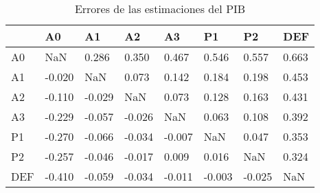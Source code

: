 \begin{table}[htbp]
\centering
\caption{Errores de las estimaciones del PIB}
\label{tab:errores_pib}
\begin{tabular}{llllllll}
\toprule
{} &      A0 &      A1 &      A2 &      A3 &      P1 &      P2 &    DEF \\
\midrule
A0  &     NaN &   0.286 &   0.350 &   0.467 &   0.546 &   0.557 &  0.663 \\
A1  &  -0.020 &     NaN &   0.073 &   0.142 &   0.184 &   0.198 &  0.453 \\
A2  &  -0.110 &  -0.029 &     NaN &   0.073 &   0.128 &   0.163 &  0.431 \\
A3  &  -0.229 &  -0.057 &  -0.026 &     NaN &   0.063 &   0.108 &  0.392 \\
P1  &  -0.270 &  -0.066 &  -0.034 &  -0.007 &     NaN &   0.047 &  0.353 \\
P2  &  -0.257 &  -0.046 &  -0.017 &   0.009 &   0.016 &     NaN &  0.324 \\
DEF &  -0.410 &  -0.059 &  -0.034 &  -0.011 &  -0.003 &  -0.025 &    NaN \\
\bottomrule
\end{tabular}
\end{table}
